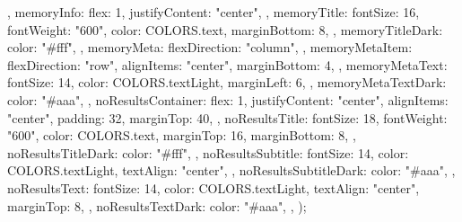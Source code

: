 {{  },
  memoryInfo: {
    flex: 1,
    justifyContent: "center",
  },
  memoryTitle: {
    fontSize: 16,
    fontWeight: "600",
    color: COLORS.text,
    marginBottom: 8,
  },
  memoryTitleDark: {
    color: "#fff",
  },
  memoryMeta: {
    flexDirection: "column",
  },
  memoryMetaItem: {
    flexDirection: "row",
    alignItems: "center",
    marginBottom: 4,
  },
  memoryMetaText: {
    fontSize: 14,
    color: COLORS.textLight,
    marginLeft: 6,
  },
  memoryMetaTextDark: {
    color: "#aaa",
  },
  noResultsContainer: {
    flex: 1,
    justifyContent: "center",
    alignItems: "center",
    padding: 32,
    marginTop: 40,
  },
  noResultsTitle: {
    fontSize: 18,
    fontWeight: "600",
    color: COLORS.text,
    marginTop: 16,
    marginBottom: 8,
  },
  noResultsTitleDark: {
    color: "#fff",
  },
  noResultsSubtitle: {
    fontSize: 14,
    color: COLORS.textLight,
    textAlign: "center",
  },
  noResultsSubtitleDark: {
    color: "#aaa",
  },
  noResultsText: {
    fontSize: 14,
    color: COLORS.textLight,
    textAlign: "center",
    marginTop: 8,
  },
  noResultsTextDark: {
    color: "#aaa",
  },
});
